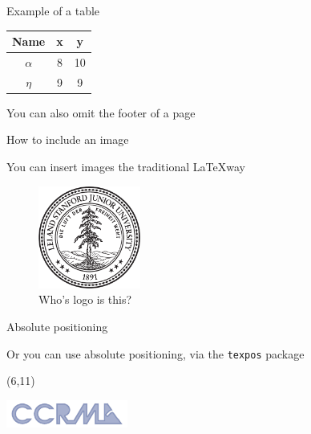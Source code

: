 \documentclass{beamer}
\begin{document}
\begin{frame}[plain]{Example of a table}

    \vspace{2cm}

    \begin{center}
        \begin{tabular}{c c c}
        \bf Name & \bf x & \bf y \\
        \hline
        $\alpha$ & 8 & 10 \\
        $\eta$ & 9 & 9 \\
        \hline
        \end{tabular}
    \end{center}

    \vspace{2cm}

    \begin{center}
    \scriptsize
    \hfill You can also omit the footer of a page
    \end{center}

\end{frame}

\begin{frame}{How to include an image}

    You can insert images the traditional \LaTeX way

    \begin{figure}
        \includegraphics[width=0.3\textwidth]{stanford-logo.pdf}
        \caption{Who's logo is this?}
    \end{figure}
\end{frame}


\begin{frame}{Absolute positioning}

    Or you can use absolute positioning, via the \texttt{texpos} package



    \begin{textblock}{20}(6,11)
    \begin{rotate}{33}
      \includegraphics[width=0.3\textwidth]{ccrma-logo.pdf}
    \end{rotate}
    \end{textblock}


\end{frame}
\end{document}
